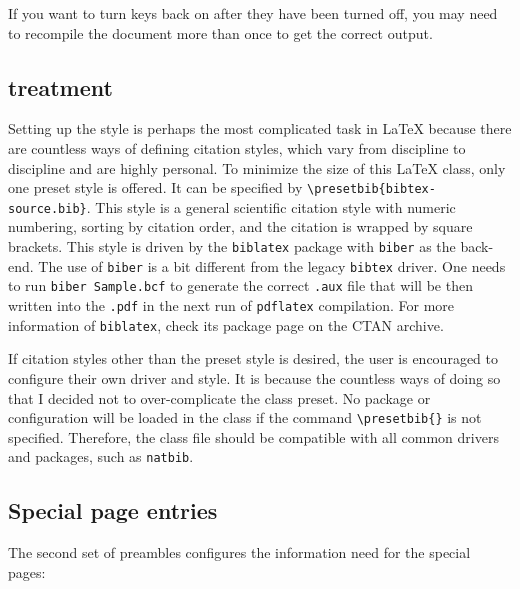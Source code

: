 \documentclass[draft]{emory}
\begin{document}
If you want to turn keys back on after they have been turned off, you may need 
to recompile the document more than once to get the correct output.

\subsection{{\BibTeX{}} treatment}
Setting up the \BibTeX{} style is perhaps the most complicated task in \LaTeX{} 
because there are countless ways of defining citation styles, which vary from 
discipline to discipline and are highly personal.
To minimize the size of this \LaTeX{} class, only one preset \BibTeX{} style
is offered. It can be specified by \Verb|\presetbib{bibtex-source.bib}|.
This style is a general scientific citation style with numeric numbering, 
sorting by citation order, and the citation is wrapped by square brackets. 
This style is driven by the \Verb|biblatex| package with \Verb|biber| as the 
back-end. 
The use of \Verb|biber| is a bit different from the legacy \Verb|bibtex| driver.
One needs to run \Verb|biber Sample.bcf| to generate the correct \Verb|.aux| 
file that will be then written into the \Verb|.pdf| in the next run of 
\Verb|pdflatex| compilation. For more information of \Verb|biblatex|, check its 
package page on the CTAN archive. 

If citation styles other than the preset style is desired, the user is 
encouraged to configure their own \BibTeX{} driver and style.
It is because the countless ways of doing so that I decided not to 
over-complicate the class preset.
No \BibTeX{} package or configuration will be loaded in the class if the 
command \Verb|\presetbib{}| is not specified. 
Therefore, the class file should be compatible with all common \BibTeX{} 
drivers and packages, such as \Verb|natbib|. 


\subsection{Special page entries}
The second set of preambles configures the information need for the special pages:
\end{document}
